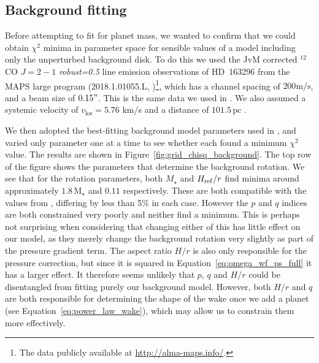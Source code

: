 \subsection{Background fitting}

Before attempting to fit for planet mass, we wanted to confirm that we could obtain $\chi^2$ minima in parameter space for sensible values of a model including only the unperturbed background disk.
To do this we used the JvM corrected \citep{jorsater1995} $^{12}$CO $J=2-1$ \textit{robust=0.5} line emission observations of HD~163296 from the MAPS large program (2018.1.01055.L, \citealt{oberg2021,czekala2021})\footnote{The data publicly available at \url{http://alma-maps.info/}.}, which has a channel spacing of $200 \mathrm{m/s}$, and a beam size of $0.15"$.
This is the same data we used in \citet{calcino2022}.
We also assumed a systemic velocity of $v_{\textrm{los}}= 5.76$ km/s \citep{teague2021} and a distance of $101.5 \, \mathrm{pc}$ \citep{gaiacollaboration2018}.

We then adopted the best-fitting background model parameters used in \citep{calcino2022}, and varied only parameter one at a time to see whether each found a minimum $\chi^2$ value.
The results  are shown in Figure~\ref{fig:grid_chisq_background}.
The top row of the figure shows the parameters that determine the background rotation.
We see that for the rotation parameters, both $M_\star$ and $H_{\rm ref}/r$ find minima around approximately $1.8 \, \mathrm{M_\star}$ and $0.11$ respectively. 
These are both compatible with the values from \citet{pinte2018a}, differing by less than 5\% in each case.
However the $p$ and $q$ indices are both constrained very poorly and neither find a minimum.
This is perhaps not surprising when considering that changing either of this has little effect on our model, as they merely change the background rotation very slightly as part of the pressure gradient term.
The aspect ratio $H/r$ is also only responsible for the pressure correction, but since it is squared in Equation~\eqref{eq:omega_wf_ps_full} it has a larger effect.
It therefore seems unlikely that $p$, $q$ and $H/r$ could be disentangled from fitting purely our background model.
However, both $H/r$ and $q$ are both responsible for determining the shape of the wake once we add a planet (see Equation~\ref{eq:power_law_wake}), which may allow us to constrain them more effectively.

